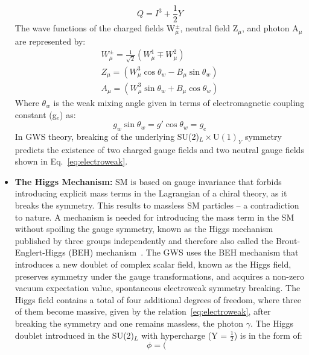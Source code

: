 \begin{itemize}
\begin{equation}\label{eq:weak_isospin}
Q = I^{3} + \frac{1}{2}Y
\end{equation}  
The wave functions of the charged fields W$^{\pm}_{\mu}$, neutral field Z$_{\mu}$, and photon A$_{\mu}$ are represented by:
\begin{equation}
\begin{split}
W^{\pm}_{\mu} = \frac{1}{\sqrt{2}}\left( W_{\mu}^{1} \mp W_{\mu}^{2}\right)\\
Z_{\mu} = \left( W_{\mu}^{3}\cos\theta_{w} - B_{\mu}\sin\theta_{w}\right)\\
A_{\mu} = \left( W_{\mu}^{3}\sin\theta_{w} + B_{\mu}\cos\theta_{w}\right)
\end{split}\label{eq:electroweak}
\end{equation}   
Where $\theta_{w}$ is the weak mixing angle given in terms of electromagnetic coupling constant (g$_{e}$) as:
\begin{equation}
g_{w}\sin\theta_{w} = g'\cos\theta_{w} = g_{e} 
\end{equation} 
In GWS theory, breaking of the underlying SU(2)$_{L}\times \text{U}(1)_{Y}$ symmetry predicts the existence of two charged gauge fields and two neutral gauge fields shown in Eq.~\ref{eq:electroweak}.  
\item{\label{item:higgs_mechanism}\textbf{The Higgs Mechanism:}} SM is based on gauge invariance that forbids introducing explicit mass terms in the Lagrangian of a chiral theory, as it breaks the symmetry. This results to massless SM particles – a contradiction to nature. A mechanism is needed for introducing the mass term in the SM without spoiling the gauge symmetry, known as the Higgs mechanism published by three groups independently and therefore also called the Brout-Englert-Higgs (BEH) mechanism~\cite{eng_brout,p_w_higgs}. The GWS uses the BEH mechanism that introduces a new doublet of complex scalar field, known as the Higgs field, preserves symmetry under the gauge transformations, and acquires a non-zero vacuum expectation value, spontaneous electroweak symmetry breaking. The Higgs field contains a total of four additional degrees of freedom, where three of them become massive, given by the relation~\ref{eq:electroweak}, after breaking the symmetry and one remains massless, the photon $\gamma$. The Higgs doublet introduced in the SU(2)$_{L}$ with hypercharge (Y = $\frac{1}{2}$) is in the form of:
\begin{equation}
\phi = \Big(\begin{array}{c}

\end{array}
\end{equation}
\end{itemize}
